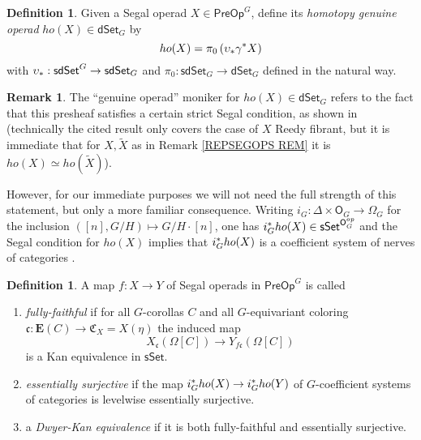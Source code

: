 \documentclass[a4paper,10pt
,draft
]{article}%
\numberwithin{equation}{section}
\numberwithin{figure}{section}
\theoremstyle{definition} %
\newtheorem{definition}[equation]{Definition}%
\newtheorem{remark}[equation]{Remark}%
\newcommand{\dSet}{\mathsf{dSet}}
\newcommand{\1}{\ensuremath{\mathbbm 1}}%
\begin{document}
\begin{definition}
	Given a Segal operad $X \in \mathsf{PreOp}^G$,
	define its \emph{homotopy genuine operad} $ho(X) \in \dSet_G$ by
\[
	ho(X) = \pi_0\left(\upsilon_{\**}\gamma^{\**}X\right)
\]
	with 
	$\upsilon_{\**}: \mathsf{sdSet}^G \to \mathsf{sdSet}_G$
	and 
	$\pi_0 \colon \mathsf{sdSet}_G \to \mathsf{dSet}_G$
	defined in the natural way. 
\end{definition}


\begin{remark}
	The ``genuine operad'' moniker for 
	$ho(X)\in \dSet_G$ refers to the fact that this presheaf satisfies a certain strict Segal condition, as shown in \cite[Prop. 5.9]{BP_edss}
	(technically the cited result only covers the case of $X$ Reedy fibrant, but it is immediate that for 
	$X,\widetilde{X}$ as in
	Remark \ref{REPSEGOPS REM} it is $ho(X) \simeq ho(\widetilde{X})$).
	
	However, for our immediate purposes we will not need the full strength of this statement, 
	but only a more familiar consequence.
	Writing
	$i_G \colon \Delta \times \mathsf{O}_G \to \Omega_G$
	for the inclusion
	$([n],G/H) \mapsto G/H \cdot [n]$,
	one has 
	$i_G^{\**}ho(X)
	\in \mathsf{sSet}^{\mathsf{O}_G^{op}}$
	and the Segal condition for $ho(X)$ implies that 
	$i_G^{\**}ho(X)$
	is a coefficient system of 
	nerves of categories \cite[Rem. 5.11]{BP_edss}.
\end{remark}


\begin{definition}
      A map $f \colon X \to Y$ of Segal operads in $\mathsf{PreOp}^G$ is called
\begin{enumerate}[label = (\roman*)]
	\item \textit{fully-faithful} if for all $G$-corollas $C$ and all $G$-equivariant coloring
	$\mathfrak{c} \colon \boldsymbol{E}(C) \to
	\mathfrak{C}_X  =X(\eta)$
	the induced map
\[
	X_{\mathfrak{c}}(\Omega[C]) \to 
	Y_{f\mathfrak{c}}(\Omega[C])
\]
            is a Kan equivalence in $\mathsf{sSet}$.
      \item \textit{essentially surjective} if the map 
      $i_G^{\**}ho(X) \to i_G^{\**}ho(Y)$ of $G$-coefficient systems of categories
            is levelwise essentially surjective.
      \item a \textit{Dwyer-Kan equivalence} if it is both fully-faithful and essentially surjective.
      \end{enumerate}
\end{definition}
\end{document}

